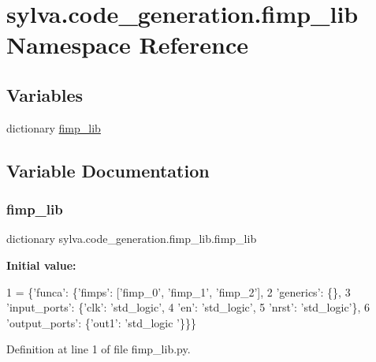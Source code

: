 \hypertarget{namespacesylva_1_1code__generation_1_1fimp__lib}{}\section{sylva.\+code\+\_\+generation.\+fimp\+\_\+lib Namespace Reference}
\label{namespacesylva_1_1code__generation_1_1fimp__lib}
\subsection*{Variables}
\begin{DoxyCompactItemize}
\item 
dictionary \hyperlink{namespacesylva_1_1code__generation_1_1fimp__lib_ad858d74deddd94b1802c3fad074f1336}{fimp\+\_\+lib}
\end{DoxyCompactItemize}


\subsection{Variable Documentation}
\mbox{\label{namespacesylva_1_1code__generation_1_1fimp__lib_ad858d74deddd94b1802c3fad074f1336}} 
\subsubsection{\texorpdfstring{fimp\+\_\+lib}{fimp\_lib}}
{\footnotesize\ttfamily dictionary sylva.\+code\+\_\+generation.\+fimp\+\_\+lib.\+fimp\+\_\+lib}

{\bfseries Initial value\+:}
\begin{DoxyCode}
1 =  \{\textcolor{stringliteral}{'funca'}: \{\textcolor{stringliteral}{'fimps'}: [\textcolor{stringliteral}{'fimp\_0'}, \textcolor{stringliteral}{'fimp\_1'}, \textcolor{stringliteral}{'fimp\_2'}],
2            \textcolor{stringliteral}{'generics'}: \{\},
3            \textcolor{stringliteral}{'input\_ports'}: \{\textcolor{stringliteral}{'clk'}: \textcolor{stringliteral}{'std\_logic'},
4                            \textcolor{stringliteral}{'en'}: \textcolor{stringliteral}{'std\_logic'},
5                            \textcolor{stringliteral}{'nrst'}: \textcolor{stringliteral}{'std\_logic'}\},
6            \textcolor{stringliteral}{'output\_ports'}: \{\textcolor{stringliteral}{'out1'}: \textcolor{stringliteral}{'std\_logic '}\}\}\}
\end{DoxyCode}


Definition at line 1 of file fimp\+\_\+lib.\+py.


